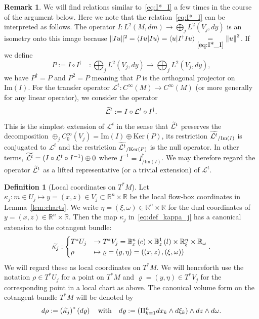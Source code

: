\documentclass[10pt]{amsart}
\theoremstyle{definition}\newtheorem{defi}[theo]{Definition}\newtheorem{rema}[theo]{Remark}\newtheorem{exam}[theo]{Example}\newtheorem{exem}[theo]{Example}\newtheorem{nota}[theo]{Notation}
\newcommand{\clL}{\mathcal{L}}
\newcommand{\Imm}{\mathrm{Im}}
\newcommand{\Kerr}{\mathrm{Ker}}
\newcommand{\bbR}{\mathbb{R}}
\newcommand{\bbB}{\mathbb{B}}
\let\oldtilde\tilde
\renewcommand*{\tilde}[1]{\mathchoice{\widetilde{#1}}{\widetilde{#1}}{\oldtilde{#1}}{\oldtilde{#1}}}
\begin{document}
\begin{rema}\label{rem:Projection}
We will find relations similar to~\eqref{eq:I*_I} a few times in the course of the argument below. Here we note that the relation~\eqref{eq:I*_I} can be interpreted as follows. The operator $I:L^{2}(M,dm)\rightarrow\bigoplus_{j}L^{2}(V_{j},dy)$ is an isometry onto this image because $\Vert Iu\Vert ^{2}=\langle Iu|Iu\rangle=\langle u|I^{\dagger}Iu\rangle\underset{\eqref{eq:I*_I}}{=}\left\Vert u\right\Vert ^{2}$. If we define
\[
P:=I\circ I^{\dagger}\quad:\bigoplus_{j}L^{2}\left(V_{j},dy\right)\rightarrow\bigoplus_{j}L^{2}\left(V_{j},dy\right),
\]
we have $P^{\dagger}=P$ and $P^{2}=P$ meaning that $P$ is the orthogonal projector on $\Imm(I)$. For the transfer operator $\clL^{t}:C^{\infty}(M)\rightarrow C^{\infty}(M)$ (or more generally for any linear operator), we consider the operator
\[
\tilde{\clL}^{t}:=I\circ\clL^{t}\circ I^{\dagger}.
\]
This is the simplest extension of $\clL^{t}$ in the sense that $\tilde{\clL}^{t}$ preserves the decomposition $\oplus_{j}C_{0}^{\infty}(V_{j})=\Imm(I)\oplus\Kerr(P)$, its restriction $\tilde{\clL^{t}}_{/\Imm(I)}$ is conjugated to $\clL^{t}$ and the restriction $\tilde{\clL^{t}}_{/\Kerr(P)}$ is the null operator. In other terms, $\tilde{\clL^{t}}=(I\circ\clL^{t}\circ I^{-1})\oplus0$ where $I^{-1}=I_{/\Imm(I)}^{\dagger}$. We may therefore regard the operator $\tilde{\clL}^{t}$ as a lifted representative (or a trivial extension) of $\clL^{t}$.
\end{rema}

\begin{defi}[Local coordinates on $T^{*}M$]\label{def:local_charts_on_T*M}
Let $\kappa_{j}:m\in U_{j}\mapsto y=(x,z)\in V_{j}\subset\bbR^{n}\times\bbR$ be the local flow-box coordinates in Lemma~\ref{lem:charts}. We write $\eta=(\xi,\omega)\in\bbR^{n}\times\bbR$ for the dual coordinates of $y=(x,z)\in\bbR^{n}\times\bbR$. Then the map $\kappa_{j}$ in~\eqref{eq:def_kappa_j} has a canonical extension to the cotangent bundle:
\begin{equation}\label{eq:def_k_tilde_j}
\tilde{\kappa_{j}}:
\begin{cases}
T^{*}U_{j} & \rightarrow T^{*}V_{j}=\bbB _{x}^{n}\left(c\right)\times\bbB _{z}^{1}\left(l\right)\times\bbR_{\xi}^{n}\times\bbR_{\omega}\\
\rho & \mapsto\varrho=\left(y,\eta\right)=\left(\left(x,z\right),\left(\xi,\omega\right)\right)
\end{cases}.
\end{equation}
We will regard these as local coordinates on $T^{*}M$. We will henceforth use the notation $\rho\in T^{*}U_{j}$ for a point on $T^{*}M$ and $\varrho=(y,\eta)\in T^{*}V_{j}$ for the corresponding point in a local chart as above. The canonical volume form on the cotangent bundle $T^{*}M$ will be denoted by
\begin{equation}\label{eq:def_d_rho}
d\rho:=\left(\tilde{\kappa_{j}}\right)^{*}\left(d\varrho\right)\quad\text{with}\quad d\varrho:=\left(\Pi_{k=1}^{n}dx_{k}\wedge d\xi_{k}\right)\wedge dz\wedge d\omega.
\end{equation}
\end{defi}
\end{document}
